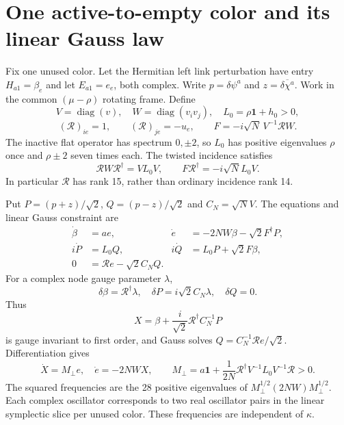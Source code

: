 \documentclass[11pt,a4paper]{article}
\newcommand{\id}{\mathbf1}\newcommand{\tr}{\operatorname{tr}}\newcommand{\diag}{\operatorname{diag}}\newcommand{\Rea}{\operatorname{Re}}
\begin{document}
\newpage
\section{One active-to-empty color and its linear Gauss law}
Fix one unused color. Let the Hermitian left link perturbation have entry $H_{a1}=\beta_e$ and let $E_{a1}=e_e$, both complex. Write $p=\delta\psi^a$ and $z=\overline{\delta\chi^a}$. Work in the common $(\mu-\rho)$ rotating frame. Define
\[
V=\diag(v),\quad W=\diag(v_iv_j),\quad L_0=\rho\id+h_0>0,
\]
\[
(\mathcal R)_{ie}=1,\qquad (\mathcal R)_{je}=-u_e,
\qquad F=-i\sqrt N\,V^{-1}\mathcal R W.
\]
The inactive flat operator has spectrum $0,\pm2$, so $L_0$ has positive eigenvalues $\rho$ once and $\rho\pm2$ seven times each. The twisted incidence satisfies
\begin{equation}
\mathcal R W\mathcal R^\dagger=VL_0V,
\qquad F\mathcal R^\dagger=-i\sqrt N L_0V.
\label{eq:twisted}
\end{equation}
In particular $\mathcal R$ has rank 15, rather than ordinary incidence rank 14.

Put $P=(p+z)/\sqrt2$, $Q=(p-z)/\sqrt2$ and $C_N=\sqrt N V$. The equations and linear Gauss constraint are
\begin{align*}
\dot\beta&=ae,&\dot e&=-2NW\beta-\sqrt2F^\dagger P,\\
i\dot P&=L_0Q,&i\dot Q&=L_0P+\sqrt2F\beta,\\
0&=\mathcal R e-\sqrt2C_NQ.
\end{align*}
For a complex node gauge parameter $\lambda$,
\[
\delta\beta=\mathcal R^\dagger\lambda,\quad
\delta P=i\sqrt2C_N\lambda,\quad\delta Q=0.
\]
Thus
\[
X=\beta+\frac i{\sqrt2}\mathcal R^\dagger C_N^{-1}P
\]
is gauge invariant to first order, and Gauss solves
$Q=C_N^{-1}\mathcal R e/\sqrt2$. Differentiation gives
\begin{equation}
\boxed{\dot X=M_\perp e,\quad\dot e=-2NWX,\qquad
M_\perp=a\id+\frac1{2N}\mathcal R^\dagger V^{-1}L_0V^{-1}\mathcal R>0.}
\label{eq:color}
\end{equation}
The squared frequencies are the 28 positive eigenvalues of
$M_\perp^{1/2}(2NW)M_\perp^{1/2}$. Each complex oscillator corresponds to two real oscillator pairs in the linear symplectic slice per unused color. These frequencies are independent of $\kappa$.

\newpage
\end{document}
